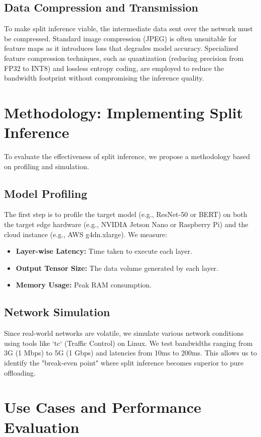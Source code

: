 \documentclass[runningheads]{llncs}
\begin{document}
\subsection{Data Compression and Transmission}
To make split inference viable, the intermediate data sent over the network must be compressed. Standard image compression (JPEG) is often unsuitable for feature maps as it introduces loss that degrades model accuracy. Specialized feature compression techniques, such as quantization (reducing precision from FP32 to INT8) and lossless entropy coding, are employed to reduce the bandwidth footprint without compromising the inference quality.

\section{Methodology: Implementing Split Inference}
To evaluate the effectiveness of split inference, we propose a methodology based on profiling and simulation.

\subsection{Model Profiling}
The first step is to profile the target model (e.g., ResNet-50 or BERT) on both the target edge hardware (e.g., NVIDIA Jetson Nano or Raspberry Pi) and the cloud instance (e.g., AWS g4dn.xlarge). We measure:
\begin{itemize}
    \item \textbf{Layer-wise Latency:} Time taken to execute each layer.
    \item \textbf{Output Tensor Size:} The data volume generated by each layer.
    \item \textbf{Memory Usage:} Peak RAM consumption.
\end{itemize}

\subsection{Network Simulation}
Since real-world networks are volatile, we simulate various network conditions using tools like `tc` (Traffic Control) on Linux. We test bandwidths ranging from 3G (1 Mbps) to 5G (1 Gbps) and latencies from 10ms to 200ms. This allows us to identify the "break-even point" where split inference becomes superior to pure offloading.

\section{Use Cases and Performance Evaluation}
\end{document}
